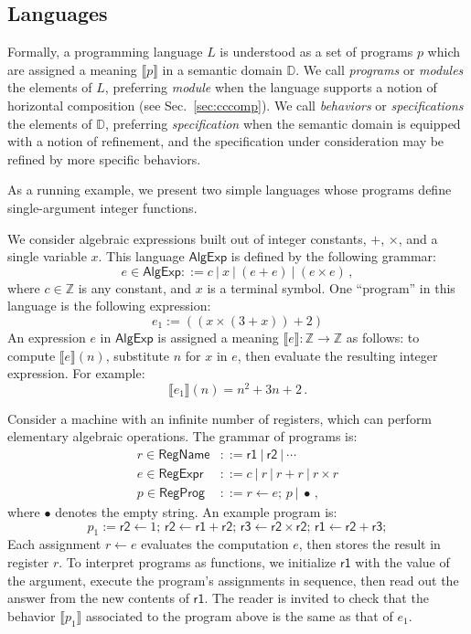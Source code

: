 \documentclass[sigplan,10pt,review,anonymous]{acmart}
\newcommand{\kw}[1]{\ensuremath{ \textsf{#1} }}
\begin{document}
\subsection{Languages} %

Formally,
a programming language $L$ is understood as
a set of programs $p$
which are assigned a meaning $\llbracket p \rrbracket$
in a semantic domain $\mathbb{D}$.
We call \emph{programs} or \emph{modules} the elements of $L$,
preferring \emph{module} when
the language supports
a notion of horizontal composition (see Sec.~\ref{sec:cccomp}).
We call \emph{behaviors} or \emph{specifications}
the elements of $\mathbb{D}$,
preferring \emph{specification} when
the semantic domain is equipped with
a notion of refinement,
and the specification under consideration
may be refined by more specific behaviors.

As a running example,
we present two simple languages
whose programs define single-argument integer functions.

\begin{example}[$\kw{AlgExp}$] %
We consider algebraic expressions
built out of integer constants, $+$, $\times$,
and a single variable $x$.
This language $\kw{AlgExp}$ is defined by the following grammar:
\[
  e \in \kw{AlgExp} ::= c \:|\: x \:|\: (e + e) \:|\: (e \times e) \,,
\]
where $c \in \mathbb{Z}$ is any constant,
and $x$ is a terminal symbol.
One ``program'' in this language is the following expression:
\[
  e_1 := ((x \times (3 + x)) + 2)
\]
An expression $e$ in \kw{AlgExp} is assigned a meaning
$\llbracket e \rrbracket : \mathbb{Z} \rightarrow \mathbb{Z}$
as follows:
to compute $\llbracket e \rrbracket(n)$,
substitute $n$ for $x$ in $e$,
then evaluate the resulting integer expression.
For example:
\[
  \llbracket e_1 \rrbracket (n) = n^2 + 3n + 2 \,.
\]
\end{example}

\begin{example}[$\kw{RegProg}$] %
Consider a machine with an infinite number of registers,
which can perform elementary algebraic operations.
The grammar of programs is:
\begin{align*}
  r \in \kw{RegName} &::= \kw{r1} \:|\: \kw{r2} \:|\: \cdots \\
  e \in \kw{RegExpr} &::= c \:|\: r \:|\: r + r \:|\: r \times r \\
  p \in \kw{RegProg} &::= r \leftarrow e; \, p \:|\: \bullet \,,
\end{align*}
where $\bullet$ denotes the empty string.
An example program is:
\[
  p_1 :=
  \kw{r2} \leftarrow 1; \,
  \kw{r2} \leftarrow \kw{r1} + \kw{r2}; \,
  \kw{r3} \leftarrow \kw{r2} \times \kw{r2}; \,
  \kw{r1} \leftarrow \kw{r2} + \kw{r3};
\]
Each assignment $r \leftarrow e$ evaluates the computation $e$,
then stores the result in register $r$.
To interpret programs as functions,
we initialize $\kw{r1}$ with the value of the argument,
execute the program's assignments in sequence,
then read out the answer from the new contents of $\kw{r1}$.
The reader is invited to check that
the behavior $\llbracket p_1 \rrbracket$ associated to the program above
is the same as that of $e_1$.
\end{example}
\end{document}

